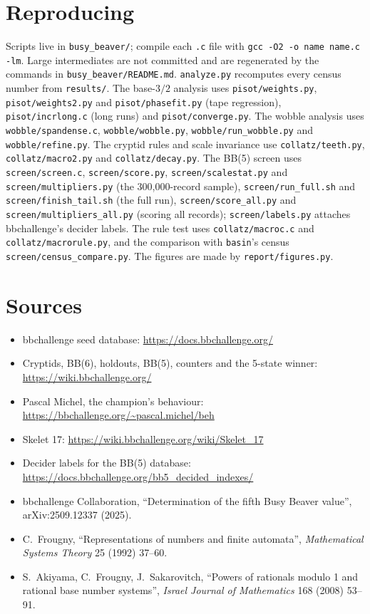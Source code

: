 \documentclass[11pt,a4paper]{article}
\newcommand{\BB}[1]{BB(#1)}
\begin{document}
\section{Reproducing}
\label{sec:repro}
Scripts live in \texttt{busy\_beaver/}; compile each \texttt{.c} file with
\texttt{gcc -O2 -o name name.c -lm}. Large intermediates are not committed and are regenerated by
the commands in \texttt{busy\_beaver/README.md}. \texttt{analyze.py} recomputes every census
number from \texttt{results/}. The base-$3/2$ analysis uses \texttt{pisot/weights.py},
\texttt{pisot/weights2.py} and \texttt{pisot/phasefit.py} (tape regression),
\texttt{pisot/incrlong.c} (long runs) and \texttt{pisot/converge.py}. The wobble analysis uses
\texttt{wobble/spandense.c}, \texttt{wobble/wobble.py}, \texttt{wobble/run\_wobble.py} and
\texttt{wobble/refine.py}. The cryptid rules and scale invariance use \texttt{collatz/teeth.py},
\texttt{collatz/macro2.py} and \texttt{collatz/decay.py}. The \BB{5} screen uses
\texttt{screen/screen.c}, \texttt{screen/score.py}, \texttt{screen/scalestat.py} and
\texttt{screen/multipliers.py} (the 300,000-record sample), \texttt{screen/run\_full.sh} and
\texttt{screen/finish\_tail.sh} (the full run), \texttt{screen/score\_all.py} and
\texttt{screen/multipliers\_all.py} (scoring all records); \texttt{screen/labels.py} attaches
bbchallenge's decider labels. The rule test uses \texttt{collatz/macroc.c} and \texttt{collatz/macrorule.py}, and the
comparison with \texttt{basin}'s census \texttt{screen/census\_compare.py}. The figures are made by
\texttt{report/figures.py}.

\section*{Sources}
\begin{itemize}\small
\item bbchallenge seed database: \url{https://docs.bbchallenge.org/}
\item Cryptids, BB(6), holdouts, BB(5), counters and the 5-state winner: \url{https://wiki.bbchallenge.org/}
\item Pascal Michel, the champion's behaviour: \url{https://bbchallenge.org/~pascal.michel/beh}
\item Skelet 17: \url{https://wiki.bbchallenge.org/wiki/Skelet_17}
\item Decider labels for the \BB{5} database: \url{https://docs.bbchallenge.org/bb5_decided_indexes/}
\item bbchallenge Collaboration, ``Determination of the fifth Busy Beaver value'', arXiv:2509.12337 (2025).
\item C.~Frougny, ``Representations of numbers and finite automata'', \emph{Mathematical Systems
Theory} 25 (1992) 37--60.
\item S.~Akiyama, C.~Frougny, J.~Sakarovitch, ``Powers of rationals modulo 1 and rational base
number systems'', \emph{Israel Journal of Mathematics} 168 (2008) 53--91.
\end{itemize}
\end{document}
